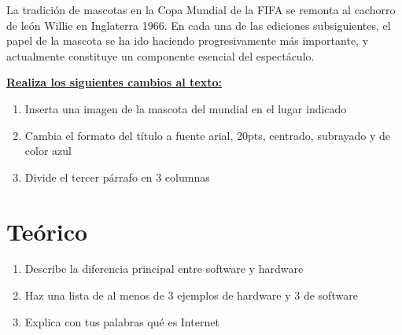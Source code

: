 \documentclass[12pt,spanish]{article}
\begin{document}
  La tradición de mascotas en la Copa Mundial de la FIFA se remonta al cachorro de león Willie en Inglaterra 1966. En cada una de las ediciones subsiguientes, el papel de la mascota se ha ido haciendo progresivamente más importante, y actualmente constituye un componente esencial del espectáculo.


  \vspace{0.1in}
  \underline{\textbf {Realiza los siguientes cambios al texto:}}
  \vspace{0.1in}
  
  \begin{enumerate}
    \item Inserta una imagen de la mascota del mundial en el lugar indicado
  \item Cambia el formato del título a fuente arial, 20pts, centrado, subrayado y de color azul
  \item Divide el tercer párrafo en 3 columnas
  \end{enumerate}

  \section{Teórico}
  \begin{enumerate}
    \item Describe la diferencia principal entre software y hardware 
  \item Haz una lista de al menos de 3 ejemplos de hardware y 3 de software 
  \item Explica con tus palabras qué es Internet 
  \end{enumerate}
\end{document}
